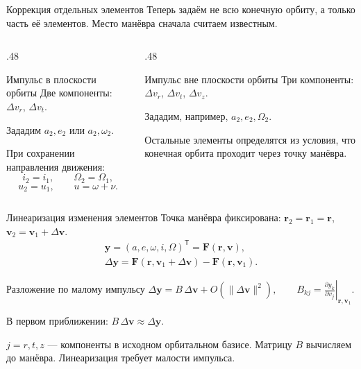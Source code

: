\documentclass[11pt,aspectratio=169,t]{beamer}
\begin{document}
\begin{frame}{Коррекция отдельных элементов}
\justifying
Теперь задаём не всю конечную орбиту, а только часть её элементов.
Место манёвра сначала считаем известным.
\begin{columns}[T,onlytextwidth]
\begin{column}{.48\textwidth}
\begin{block}{Импульс в плоскости орбиты}
Две компоненты: $\Delta v_r$, $\Delta v_t$.
\par\medskip
Зададим $a_2,e_2$ или $a_2,\omega_2$.
\end{block}
\justifying
При сохранении направления движения:
\[
i_2=i_1,\qquad\Omega_2=\Omega_1,
\]
\[
u_2=u_1,\qquad u=\omega+\nu.
\]
\end{column}
\begin{column}{.48\textwidth}
\begin{block}{Импульс вне плоскости орбиты}
Три компоненты: $\Delta v_r$, $\Delta v_t$, $\Delta v_z$.
\par\medskip
Зададим, например, $a_2,e_2,\Omega_2$.
\end{block}
\justifying
Остальные элементы определятся из условия, что конечная орбита проходит через точку манёвра.
\end{column}
\end{columns}
\end{frame}

\begin{frame}{Линеаризация изменения элементов}
\setlength{\abovedisplayskip}{3pt}
\setlength{\belowdisplayskip}{3pt}
Точка манёвра фиксирована: $\mathbf r_2=\mathbf r_1=\mathbf r$,
$\mathbf v_2=\mathbf v_1+\Delta\mathbf v$.
\begin{gather*}
\mathbf y=(a,e,\omega,i,\Omega)^{\mathsf T}=\mathbf F(\mathbf r,\mathbf v),\\[3pt]
\Delta\mathbf y=
\mathbf F(\mathbf r,\mathbf v_1+\Delta\mathbf v)
-\mathbf F(\mathbf r,\mathbf v_1).
\end{gather*}
\begin{block}{Разложение по малому импульсу}
\centering
$\displaystyle
\Delta\mathbf y=B\,\Delta\mathbf v
+O\!\left(\|\Delta\mathbf v\|^2\right),\qquad
B_{kj}=\left.\frac{\partial y_k}{\partial v_j}\right|_{\mathbf r,\mathbf v_1}.
$
\par\medskip
В первом приближении: $\boxed{B\,\Delta\mathbf v\approx\Delta\mathbf y}$.
\end{block}
\justifying
$j=r,t,z$ --- компоненты в исходном орбитальном базисе.
Матрицу $B$ вычисляем до манёвра. Линеаризация требует малости импульса.
\end{frame}
\end{document}
